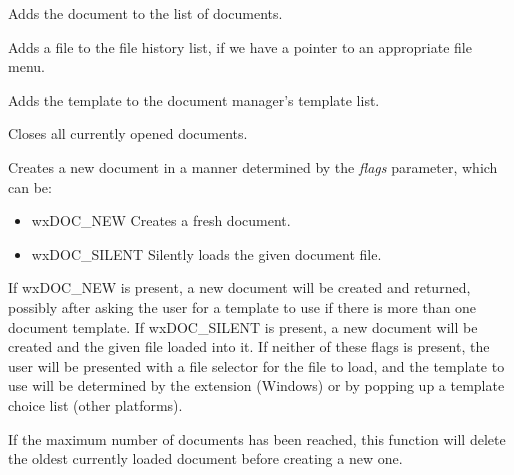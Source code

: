 Adds the document to the list of documents.

\label{wxdocmanageraddfiletohistory}


Adds a file to the file history list, if we have a pointer to an appropriate file menu.

\label{wxdocmanagerassociatetemplate}


Adds the template to the document manager's template list.

\label{wxdocmanagerclosedocuments}


Closes all currently opened documents.

\label{wxdocmanagercreatedocument}


Creates a new document in a manner determined by the {\it flags} parameter, which can be:

\begin{itemize}\itemsep=0pt
\item wxDOC\_NEW Creates a fresh document.
\item wxDOC\_SILENT Silently loads the given document file.
\end{itemize}

If wxDOC\_NEW is present, a new document will be created and returned, possibly after
asking the user for a template to use if there is more than one document template.
If wxDOC\_SILENT is present, a new document will be created and the given file loaded
into it. If neither of these flags is present, the user will be presented with
a file selector for the file to load, and the template to use will be determined by the
extension (Windows) or by popping up a template choice list (other platforms).

If the maximum number of documents has been reached, this function
will delete the oldest currently loaded document before creating a new one.

\label{wxdocmanagercreateview}

